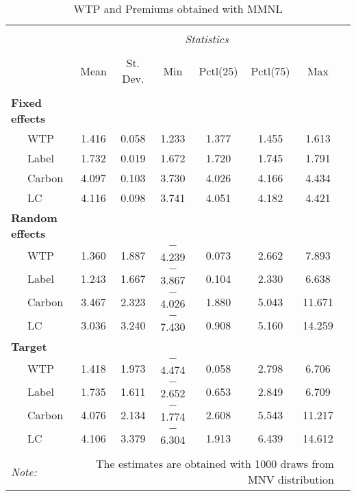 \documentclass[11pt,]{article}
\begin{document}
\begin{table}[!htbp] \centering 
  \caption{WTP and Premiums obtained with MMNL} 
  \label{tab:wtpr} 
\begin{tabular}{@{\extracolsep{5pt}}lccccccc} 
\\[-1.8ex]\hline 
\hline \\[-1.8ex]  
& \multicolumn{6}{c}{\textit{Statistics}} \\
\cline{2-7} 
\\[-1.8ex] & \multicolumn{1}{c}{Mean} & \multicolumn{1}{c}{St. Dev.} & \multicolumn{1}{c}{Min} & \multicolumn{1}{c}{Pctl(25)} & \multicolumn{1}{c}{Pctl(75)} & \multicolumn{1}{c}{Max} \\ 
\hline \\[-1.8ex] 
\textbf{Fixed effects} & & & & & & \\
  ~~~WTP & 1.416 & 0.058 & 1.233 & 1.377 & 1.455 & 1.613 \\ 
  ~~~Label & 1.732 & 0.019 & 1.672 & 1.720 & 1.745 & 1.791 \\ 
  ~~~Carbon & 4.097 & 0.103 & 3.730 & 4.026 & 4.166 & 4.434 \\ 
  ~~~LC & 4.116 & 0.098 & 3.741 & 4.051 & 4.182 & 4.421 \\ 
\textbf{Random effects} & & & & & & \\ 
  ~~~WTP & 1.360 & 1.887 & $-$4.239 & 0.073 & 2.662 & 7.893 \\ 
  ~~~Label & 1.243 & 1.667 & $-$3.867 & 0.104 & 2.330 & 6.638 \\ 
  ~~~Carbon & 3.467 & 2.323 & $-$4.026 & 1.880 & 5.043 & 11.671 \\ 
  ~~~LC & 3.036 & 3.240 & $-$7.430 & 0.908 & 5.160 & 14.259 \\ 
\textbf{Target} & & & & & & \\
  ~~~WTP & 1.418 & 1.973 & $-$4.474 & 0.058 & 2.798 & 6.706 \\
  ~~~Label & 1.735 & 1.611 & $-$2.652 & 0.653 & 2.849 & 6.709 \\ 
  ~~~Carbon & 4.076 & 2.134 & $-$1.774 & 2.608 & 5.543 & 11.217 \\ 
  ~~~LC & 4.106 & 3.379 & $-$6.304 & 1.913 & 6.439 & 14.612 \\ 
\hline \\[-1.8ex] 
\textit{Note:}  & \multicolumn{6}{r}{The estimates are obtained with 1000 draws from MNV distribution} \\ 
\end{tabular} 
\end{table}
\end{document}
